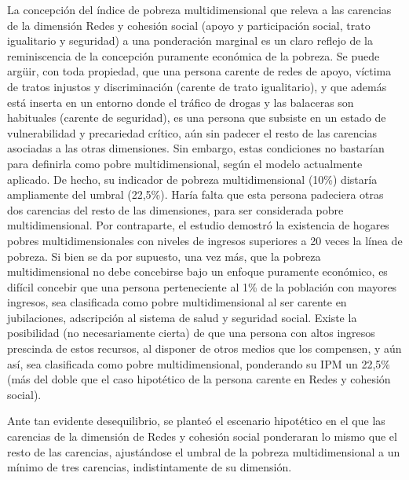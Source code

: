 \documentclass[12pt,letterpaper,spanish]{article}
\begin{document}
\begin{enumerate}
La concepción del índice de pobreza multidimensional que releva a las carencias de la dimensión Redes y cohesión social (apoyo y participación social, trato igualitario y seguridad) a una ponderación marginal es un  claro reflejo de la reminiscencia de la concepción puramente económica de la pobreza. Se puede argüir, con toda propiedad, que una persona carente de redes de apoyo, víctima de tratos injustos y discriminación (carente de trato igualitario), y que además está inserta en un entorno donde el tráfico de drogas y las balaceras son habituales (carente de seguridad), es una persona que subsiste en un estado de vulnerabilidad y precariedad crítico, aún sin padecer el resto de las carencias asociadas a las otras dimensiones. Sin embargo, estas condiciones no bastarían para definirla como pobre multidimensional, según el modelo actualmente aplicado. De hecho, su indicador de pobreza multidimensional (10\%) distaría ampliamente del umbral (22,5\%). Haría falta que esta persona padeciera otras dos carencias del resto de las dimensiones, para ser considerada pobre multidimensional. Por contraparte, el estudio demostró la existencia de hogares pobres multidimensionales con niveles de ingresos superiores a 20 veces la línea de pobreza. Si bien se da por supuesto, una vez más, que la pobreza multidimensional no debe concebirse bajo un enfoque puramente económico, es difícil concebir que una persona perteneciente al 1\% de la población con mayores ingresos, sea clasificada como pobre multidimensional al ser carente en jubilaciones, adscripción al sistema de salud y  seguridad social. Existe la posibilidad (no necesariamente cierta) de que una persona con altos ingresos prescinda de estos recursos, al disponer de otros medios que los compensen, y aún así, sea clasificada como pobre multidimensional, ponderando su IPM un 22,5\% (más del doble que el caso hipotético de la persona carente en Redes y cohesión social). 

Ante tan evidente desequilibrio, se planteó el escenario hipotético en el que las carencias de la dimensión de Redes y cohesión social ponderaran lo mismo que el resto de las carencias, ajustándose el umbral de la pobreza multidimensional a un mínimo de tres carencias, indistintamente de su dimensión. 


\end{enumerate}
\end{document}
